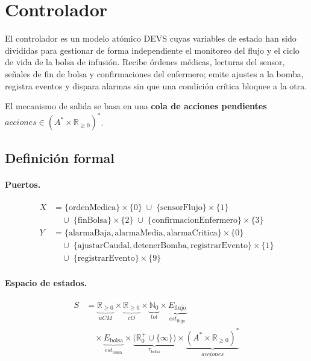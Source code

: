 \section{Controlador}

El controlador es un modelo atómico DEVS cuyas variables de estado han sido divididas para gestionar de forma independiente el monitoreo del flujo y el ciclo de vida de la bolsa de infusión. Recibe órdenes médicas, lecturas del sensor, señales de fin de bolsa y confirmaciones del enfermero; emite ajustes a la bomba, registra eventos y dispara alarmas sin que una condición crítica bloquee a la otra.

El mecanismo de salida se basa en una \textbf{cola de acciones pendientes} $\mathit{acciones} \in (A^* \times \mathbb{R}_{\ge 0})^*$.

\subsection{Definición formal}

\paragraph{Puertos.}
\begin{align*}
  X &= \{\mathrm{ordenMedica}\}\!\times\!\{0\}
        \;\cup\; \{\mathrm{sensorFlujo}\}\!\times\!\{1\} \\
    &\quad \cup\; \{\mathrm{finBolsa}\}\!\times\!\{2\}
        \;\cup\; \{\mathrm{confirmacionEnfermero}\}\!\times\!\{3\}
  \\[4pt]
  Y &= \{\mathrm{alarmaBaja},\mathrm{alarmaMedia},\mathrm{alarmaCritica}\}
            \!\times\!\{0\} \\
    &\quad \cup\;
        \{\mathrm{ajustarCaudal},\mathrm{detenerBomba},\mathrm{registrarEvento}\}
            \!\times\!\{1\} \\
    &\quad \cup\;
        \{\mathrm{registrarEvento}\}\!\times\!\{9\}
\end{align*}

\paragraph{Espacio de estados.}
\begin{align*}
  S &= \underbrace{\mathbb{R}_{\ge 0}}_{\mathit{uCM}}
     \times
     \underbrace{\mathbb{R}_{\ge 0}}_{\mathit{cO}}
     \times
     \underbrace{\mathbb{N}_0}_{\mathit{tol}}
     \times
     \underbrace{E_{\mathrm{flujo}}}_{\mathit{est}_{\mathrm{flujo}}} \\
    &\quad \times
     \underbrace{E_{\mathrm{bolsa}}}_{\mathit{est}_{\mathrm{bolsa}}}
     \times
     \underbrace{\bigl(\mathbb{R}_0^+ \cup \{\infty\}\bigr)}_{\tau_{\mathrm{bolsa}}}
     \times
     \underbrace{(A^* \times \mathbb{R}_{\ge 0})^*}_{\mathit{acciones}}
\end{align*}

